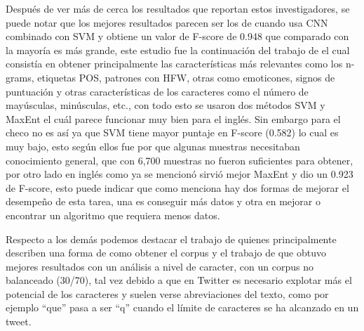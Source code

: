 \par Después de ver más de cerca los resultados que reportan estos investigadores, se puede notar que los mejores resultados parecen ser los de \cite{poria2016deeper} cuando usa CNN combinado con SVM y obtiene un valor de  \gls{F-score} de 0.948 que comparado con la mayoría es más grande, este estudio fue la continuación del trabajo de \cite{ptavcek2014sarcasm} el cual consistía en obtener principalmente las características más relevantes como los \gls{n-grams}, etiquetas \gls{POS}, patrones con \gls{HFW}, otras como emoticones, signos de puntuación y otras características de los caracteres como el número de mayúsculas, minúsculas, etc., con todo esto se usaron dos métodos \gls{SVM} y \gls{MaxEnt} el cuál parece funcionar muy bien para el inglés. Sin embargo para el checo no es así ya que SVM tiene mayor puntaje en F-score (0.582) lo cual es muy bajo, esto según ellos fue por que algunas muestras necesitaban conocimiento general, que con 6,700 muestras no fueron suficientes para obtener, por otro lado en inglés como ya se mencionó sirvió mejor \gls{MaxEnt} y dio un 0.923 de F-score, esto puede indicar que como \cite{domingos2012few} menciona hay dos formas de mejorar el desempeño de esta tarea, una es conseguir más datos y otra en mejorar o encontrar un algoritmo que requiera menos datos.

\par Respecto a los demás podemos destacar el trabajo de \cite{reyes2012making} quienes principalmente describen una forma de como obtener el corpus y el trabajo de  \cite{lopez2016character} que obtuvo mejores resultados con un análisis a nivel de caracter, con un corpus no balanceado (30/70), tal vez debido a que en Twitter es necesario explotar más el potencial de los caracteres y suelen verse abreviaciones del texto, como por ejemplo  ``que'' pasa a ser ``q'' cuando el límite de caracteres se ha alcanzado en un tweet.